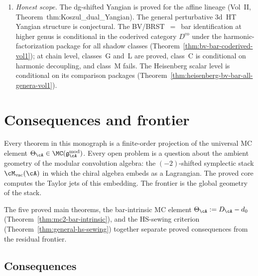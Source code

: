 \begin{enumerate}[label=\textup{(N\arabic*)}]
 identity, and no additional consistency check is required.
 Two distinct questions:
 (a)~multi-weight algebras at $g\ge2$ carry the full decomposition
 $F_g=\kappa\lambda_g^{\mathrm{FP}}+\delta F_g^{\mathrm{cross}}$
 (Theorem~\ref{thm:multi-weight-genus-expansion});
 (b)~the independent open-sector derivation of genus-$g$
 amplitudes from iterated clutching on
 $\mathcal{C}_{\mathrm{op}}$ without using the bar-intrinsic
 construction.
\item \emph{Honest scope.}
 The dg-shifted Yangian is proved for the affine lineage
 (Vol~II, Theorem~\textup{thm:Koszul\_dual\_Yangian}).
 The general perturbative 3d~HT Yangian structure is conjectural.
 The BV/BRST~$=$~bar identification at higher genus is conditional
 in the coderived category $D^{\mathrm{co}}$ under the harmonic-factorization
 package for all shadow classes
 (Theorem~\ref{thm:bv-bar-coderived-vol1});
 at chain level, classes~G and~L are proved, class~C is conditional
 on harmonic decoupling, and class~M fails.
 The Heisenberg scalar level is conditional on its comparison packages
 (Theorem~\ref{thm:heisenberg-bv-bar-all-genera-vol1}).
\end{enumerate}

\section{Consequences and frontier}
\label{sec:concordance-conjecture-promotions}

Every theorem in this monograph is a finite-order projection of the
universal MC element $\Theta_\cA \in \MC(\mathfrak{g}^{\mathrm{mod}}_\cA)$.
Every open problem is a question about the ambient geometry of the
modular convolution algebra: the $(-2)$-shifted symplectic stack
$\cM_{\mathrm{vac}}(\cA)$ in which the chiral algebra embeds as a
Lagrangian. The proved core computes the Taylor jets of this embedding.
The frontier is the global geometry of the stack.

The five proved main theorems, the bar-intrinsic MC element
$\Theta_\cA := D_\cA - d_0$
(Theorem~\ref{thm:mc2-bar-intrinsic}), and the HS-sewing
criterion (Theorem~\ref{thm:general-hs-sewing}) together
separate proved consequences from the residual frontier.

\subsection{Consequences}\label{subsec:concordance-promotions}

